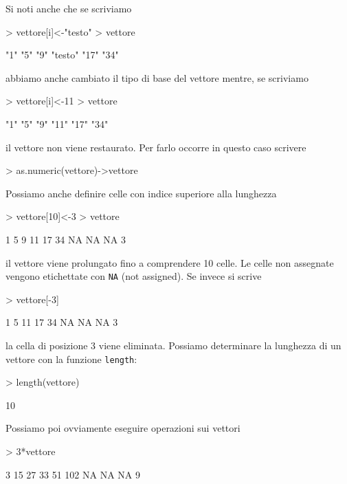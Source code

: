 \documentclass[onecolumn,11pt]{book}
\begin{document}
Si noti anche che se scriviamo
\begin{Schunk}
\begin{Sinput}
> vettore[i]<-"testo"
> vettore
\end{Sinput}
\begin{Soutput}
[1] "1"     "5"     "9"     "testo" "17"    "34"   
\end{Soutput}
\end{Schunk}
abbiamo anche cambiato il tipo di base del vettore mentre, se scriviamo
\begin{Schunk}
\begin{Sinput}
> vettore[i]<-11
> vettore
\end{Sinput}
\begin{Soutput}
[1] "1"  "5"  "9"  "11" "17" "34"
\end{Soutput}
\end{Schunk}
il vettore non viene restaurato. Per farlo occorre in questo caso scrivere
\begin{Schunk}
\begin{Sinput}
> as.numeric(vettore)->vettore 
\end{Sinput}
\end{Schunk}
Possiamo anche definire celle con indice superiore alla lunghezza
\begin{Schunk}
\begin{Sinput}
> vettore[10]<-3
> vettore
\end{Sinput}
\begin{Soutput}
 [1]  1  5  9 11 17 34 NA NA NA  3
\end{Soutput}
\end{Schunk}
 il vettore viene prolungato fino a comprendere 10 celle. Le celle non assegnate vengono etichettate con \texttt{NA} (not assigned).
 Se invece si scrive
\begin{Schunk}
\begin{Sinput}
> vettore[-3]
\end{Sinput}
\begin{Soutput}
[1]  1  5 11 17 34 NA NA NA  3
\end{Soutput}
\end{Schunk}
la cella di posizione 3 viene eliminata.
Possiamo determinare la lunghezza di un vettore con la funzione \texttt{length}:
\begin{Schunk}
\begin{Sinput}
> length(vettore)
\end{Sinput}
\begin{Soutput}
[1] 10
\end{Soutput}
\end{Schunk}
 Possiamo poi ovviamente eseguire operazioni sui vettori
\begin{Schunk}
\begin{Sinput}
> 3*vettore
\end{Sinput}
\begin{Soutput}
 [1]   3  15  27  33  51 102  NA  NA  NA   9
\end{Soutput}
\end{Schunk}
 
\end{document}
